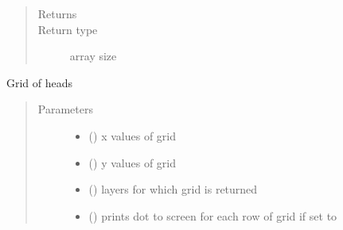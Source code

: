 \documentclass[letterpaper,10pt,english]{sphinxmanual}
\begin{document}
\begin{fulllineitems}
\begin{fulllineitems}
\begin{quote}
\begin{description}
\item[{Returns}] \leavevmode
{}

\item[{Return type}] \leavevmode
array size 

\end{description}\end{quote}




{\hyperref[\detokenize{models/model:timml.model.Model.headgrid2}]{}}



\end{fulllineitems}


\begin{fulllineitems}
\label{\detokenize{models/model3d:timml.model.Model3D.headgrid2}}
Grid of heads
\begin{quote}\begin{description}
\item[{Parameters}] \leavevmode\begin{itemize}
\item {} 
\sphinxstyleliteralstrong{, } (\sphinxstyleliteralemphasis{,}) \textendash{} x values of grid

\item {} 
\sphinxstyleliteralstrong{, } (\sphinxstyleliteralemphasis{,}) \textendash{} y values of grid

\item {} 
 (\sphinxstyleliteralemphasis{, }\sphinxstyleliteralemphasis{, }) \textendash{} layers for which grid is returned

\item {} 
 (\sphinxstyleliteralemphasis{, }) \textendash{} prints dot to screen for each row of grid if set to 


\end{itemize}
\end{description}
\end{quote}
\end{fulllineitems}
\end{fulllineitems}
\end{document}
